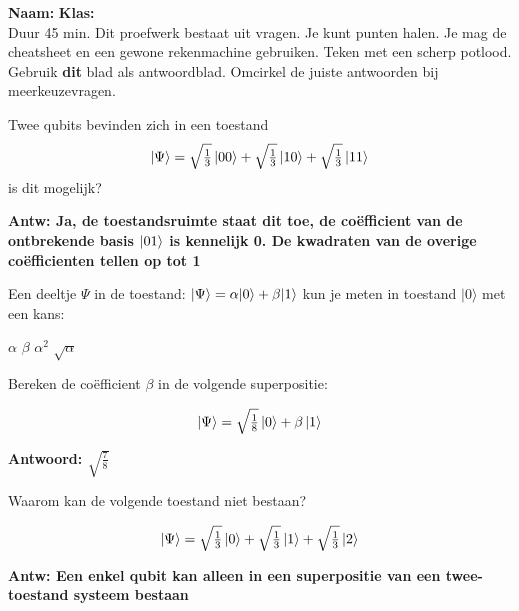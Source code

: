 \documentclass[a4paper, addpoints, 12pt
    , answers    %
    ]{exam}
\newcommand{\timelimit}{45 min.}
\begin{document}
\hfill\textbf{Naam:}\enspace\makebox[2in]{\hrulefill} \textbf{Klas:}\enspace\makebox[1in]{\hrulefill} \\

Duur \timelimit
Dit proefwerk bestaat uit \numquestions{} vragen. Je kunt \numpoints{} punten halen. %
Je mag de cheatsheet en een gewone rekenmachine gebruiken. Teken met een scherp potlood. Gebruik \textbf{dit} blad als antwoordblad. Omcirkel de juiste antwoorden bij meerkeuzevragen.

\begin{questions}
\pointsinmargin  %

\question[1]
Twee qubits bevinden zich in een toestand
\[\ket{\Psi} = \sqrt{\tfrac{1}{3}}\ket{00}+ \sqrt{\tfrac{1}{3}}\ket{10}+\sqrt{\tfrac{1}{3}}\ket{11}\]
is dit mogelijk?

\ifprintanswers
\textbf{Antw: Ja, de toestandsruimte staat dit toe, de co\"efficient van de ontbrekende basis $\ket{01}$ is kennelijk 0. De kwadraten van de overige co\"efficienten tellen op tot 1
}
\else
\fillwithlines{.5in}
\fi


\question[1]
Een deeltje $\Psi$ in de toestand: $\ket{\Psi}=\alpha |0 \rangle + \beta |1 \rangle$
kun je meten in toestand $| 0 \rangle$ met een kans:

\begin{choices}
\choice $\alpha$
\choice $\beta$
\correctchoice $\alpha^2$
\choice $\sqrt{\alpha}$
\end{choices}

\question[1]
Bereken de co\"efficient $\beta$ in de volgende superpositie:

\[\ket{\Psi} = \sqrt{\tfrac{1}{8}}\ket{0}+ \beta\ket{1}\]

\ifprintanswers
\textbf{Antwoord: $\sqrt{\tfrac{7}{8}}$
}
\else
\fillwithlines{.5in}
\fi

\question[1]
Waarom kan de volgende toestand niet bestaan?

\[\ket{\Psi} = \sqrt{\tfrac{1}{3}}\ket{0}+ \sqrt{\tfrac{1}{3}}\ket{1}+\sqrt{\tfrac{1}{3}}\ket{2}\]

\ifprintanswers
\textbf{Antw: Een enkel qubit kan alleen in een superpositie van een twee-toestand systeem bestaan
}
\else
\fillwithlines{.5in}
\fi


\end{questions}
\end{document}
